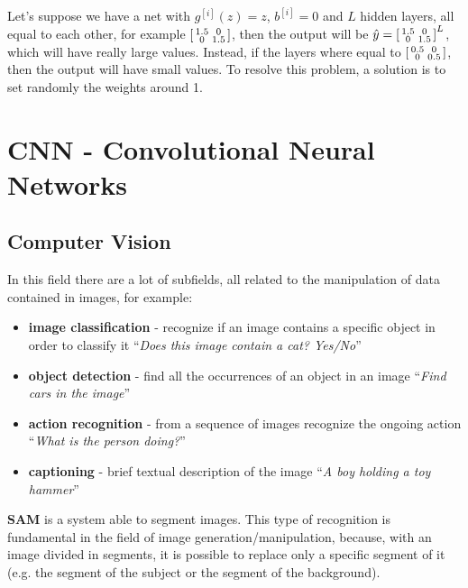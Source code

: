 \documentclass[oneside]{academica}
\begin{document}
Let's suppose we have a net with $g^{[i]}(z) = z$, $b^{[i]} = 0$ and $L$ hidden layers, all equal to each other, for example $\begin{bsmallmatrix} 1.5 & 0 \\ 0 & 1.5 \end{bsmallmatrix}$, then the output will be $\hat{y} = \begin{bsmallmatrix} 1.5 & 0 \\ 0 & 1.5 \end{bsmallmatrix}^L$, which will have really large values.
Instead, if the layers where equal to $\begin{bsmallmatrix} 0.5 & 0 \\ 0 & 0.5 \end{bsmallmatrix}$, then the output will have small values.
To resolve this problem, a solution is to set randomly the weights around 1.

\chapter{CNN - Convolutional Neural Networks}

\section{Computer Vision}

In this field there are a lot of subfields, all related to the manipulation of data contained in images, for example:
\begin{itemize}
  \item \textbf{image classification} - recognize if an image contains a specific object in order to classify it ``\textit{Does this image contain a cat? Yes/No}''
  \item \textbf{object detection} - find all the occurrences of an object in an image ``\textit{Find cars in the image}''
  \item \textbf{action recognition} - from a sequence of images recognize the ongoing action ``\textit{What is the person doing?}''
  \item \textbf{captioning} - brief textual description of the image ``\textit{A boy holding a toy hammer}''
\end{itemize}

\textbf{SAM} is a system able to segment images.
This type of recognition is fundamental in the field of image generation/manipulation, because, with an image divided in segments, it is possible to replace only a specific segment of it (e.g. the segment of the subject or the segment of the background).
\end{document}
